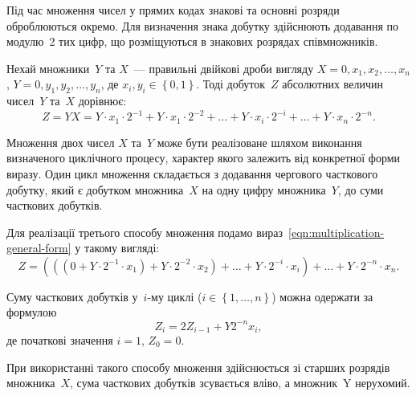 \documentclass[a4paper,oneside,DIV=12,12pt]{scrartcl}
\begin{document}
	\begin{solution}
		Під час множення чисел у прямих кодах знакові та основні розряди оброблюються окремо. Для визначення знака добутку здійснюють додавання по модулю~2 тих цифр, що розміщуються в знакових розрядах співмножників.
		
		Нехай множники~$Y$ та $X$~— правильні двійкові дроби вигляду $X = 0, x_1, x_2, \dots, x_n$, $Y = 0, y_1, y_2, \dots, y_n$, де $x_i, y_i \in \left\{0, 1\right\}$. Тоді добуток~$Z$ абсолютних величин чисел~$Y$ та~$X$ дорівнює:
		\begin{equation}
		\label{eqn:multiplication-general-form}
			Z = YX
			  = Y \cdot x_1 \cdot 2^{-1}
			  + Y \cdot x_1 \cdot 2^{-2}
			  + \ldots
			  + Y \cdot x_i \cdot 2^{-i}
			  + \ldots
			  + Y \cdot x_n \cdot 2^{-n}.
		\end{equation}
		
		Множення двох чисел $X$ та~$Y$ може бути реалізоване шляхом виконання визначеного циклічного процесу, характер якого залежить від конкретної форми виразу. Один цикл множення складається з додавання чергового часткового добутку, який є добутком множника~$X$ на одну цифру множника~$Y$, до суми часткових добутків.
		
		Для реалізації третього способу множення подамо вираз~\eqref{eqn:multiplication-general-form} у такому вигляді:
		\[
			Z =
			\left(
				\left(
					\left(
						0
						+ Y \cdot 2^{-1} \cdot x_1
					\right)
					+ Y \cdot 2^{-2} \cdot x_2
				\right)
				+ \ldots
				+ Y \cdot 2^{-i} \cdot x_i
			\right)
			+ \ldots
			+ Y \cdot 2^{-n} \cdot x_n.
		\]
		
		Суму часткових добутків у~$i$-му циклі ($i \in \left\{ 1, \dots, n \right\}$) можна одержати за формулою
		\[
			Z_i = 2 Z_{i - 1} + Y 2^{-n} x_i,
		\]
		де початкові значення $i = 1$, $Z_0 = 0$.
		
		При використанні такого способу множення здійснюється зі старших розрядів множника~$X$, сума часткових добутків зсувається вліво, а множник~Y нерухомий.
		

\end{solution}
\end{document}
